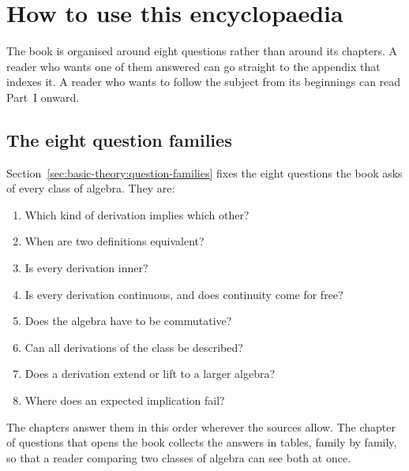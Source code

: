 \chapter*{How to use this encyclopaedia}
\label{page:how-to-use}

The book is organised around eight questions rather than around its chapters. %
A reader who wants one of them answered can go straight to the %
appendix that indexes it. A reader who wants to follow the subject from its %
beginnings can read Part~I onward. %

\section*{The eight question families}

Section~\ref{sec:basic-theory:question-families} fixes the eight questions the %
book asks of every class of algebra. They are: %

\begin{enumerate}
\item Which kind of derivation implies which other?
\item When are two definitions equivalent?
\item Is every derivation inner?
\item Is every derivation continuous, and does continuity come for free?
\item Does the algebra have to be commutative?
\item Can all derivations of the class be described?
\item Does a derivation extend or lift to a larger algebra?
\item Where does an expected implication fail?
\end{enumerate}

The chapters answer them in this order wherever the sources allow. %
The chapter of questions that opens the book collects the answers in tables, family by family, %
so that a reader comparing two classes of algebra can see both at once. %

